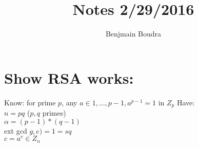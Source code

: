 \documentclass{Algorithms}
\title{Notes 2/29/2016}
\author{Benjmain Boudra}
\begin{document}
  \maketitle
  \tableofcontents

  \section{Show RSA works:}
  Know: for prime $p$, any $a \in {1,\ldots,p-1}, a^{p-1} = 1$ in $Z_p$
  Have: \\
  $n = pq$ ($p,q$ primes)\\
  $\alpha = (p-1)*(q-1)$\\
  ext gcd $g,e) = 1 = sq$\\
  $c = a^e \in Z_n$\\
\end{document}
